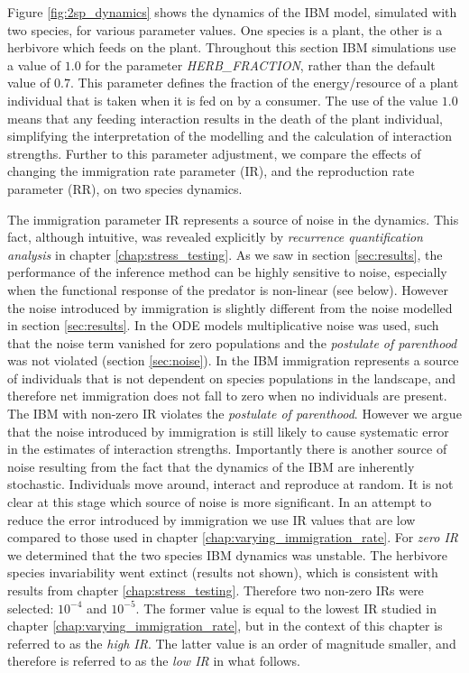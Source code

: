 Figure \ref{fig:2sp_dynamics} shows the dynamics of the IBM model, simulated with two species, for various parameter values. One species is a plant, the other is a herbivore which feeds on the plant. Throughout this section IBM simulations use a value of $1.0$ for the parameter \emph{HERB\_FRACTION}, rather than the default value of $0.7$.  This parameter defines the fraction of the energy/resource of a plant individual that is taken when it is fed on by a consumer. The use of the value $1.0$ means that any feeding interaction results in the death of the plant individual, simplifying the interpretation of the modelling and the calculation of interaction strengths. Further to this parameter adjustment, we compare the effects of changing the immigration rate parameter (IR), and the reproduction rate parameter (RR), on two species dynamics.

The immigration parameter IR represents a source of noise in the dynamics. This fact, although intuitive, was revealed explicitly by \emph{recurrence quantification analysis} in chapter \ref{chap:stress_testing}. As we saw in section \ref{sec:results}, the performance of the inference method can be highly sensitive to noise, especially when the functional response of the predator is non-linear (see below). However the noise introduced by immigration is slightly different from the noise modelled in section \ref{sec:results}. In the ODE models multiplicative noise was used, such that the noise term vanished for zero populations and the \emph{postulate of parenthood} was not violated (section \ref{sec:noise}). In the IBM immigration represents a source of individuals that is not dependent on species populations in the landscape, and therefore net immigration does not fall to zero when no individuals are present. The IBM with non-zero IR violates the \emph{postulate of parenthood}. However we argue that the noise introduced by immigration is still likely to cause systematic error in the estimates of interaction strengths. Importantly there is another source of noise resulting from the fact that the dynamics of the IBM are inherently stochastic. Individuals move around, interact and reproduce at random. It is not clear at this stage which source of noise is more significant. In an attempt to reduce the error introduced by immigration we use IR values that are low compared to those used in chapter \ref{chap:varying_immigration_rate}. For \emph{zero IR} we determined that the two species IBM dynamics was unstable. The herbivore species invariability went extinct (results not shown), which is consistent with results from chapter \ref{chap:stress_testing}. Therefore two non-zero IRs were selected: $10^{-4}$ and $10^{-5}$. The former value is equal to the lowest IR studied in chapter \ref{chap:varying_immigration_rate}, but in the context of this chapter is referred to as the \emph{high IR}. The latter value is an order of magnitude smaller, and therefore is referred to as the \emph{low IR} in what follows. 

